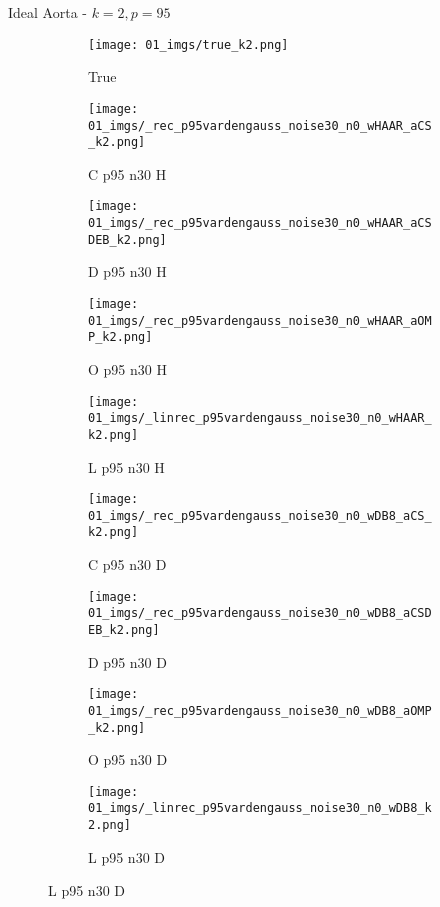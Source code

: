 \begin{frame}{Ideal Aorta - $k=2,p=95$}{}
\begin{figure}
\begin{subfigure}{0.1\textwidth}
\texttt{[image: 01\_imgs/true\_k2.png]}
\caption*{\Tiny True}
\end{subfigure}
\begin{subfigure}{0.1\textwidth}
\texttt{[image: 01\_imgs/\_rec\_p95vardengauss\_noise30\_n0\_wHAAR\_aCS\_k2.png]}
\caption*{\Tiny C p95 n30 H}
\end{subfigure}
\begin{subfigure}{0.1\textwidth}
\texttt{[image: 01\_imgs/\_rec\_p95vardengauss\_noise30\_n0\_wHAAR\_aCSDEB\_k2.png]}
\caption*{\Tiny D p95 n30 H}
\end{subfigure}
\begin{subfigure}{0.1\textwidth}
\texttt{[image: 01\_imgs/\_rec\_p95vardengauss\_noise30\_n0\_wHAAR\_aOMP\_k2.png]}
\caption*{\Tiny O p95 n30 H}
\end{subfigure}
\begin{subfigure}{0.1\textwidth}
\texttt{[image: 01\_imgs/\_linrec\_p95vardengauss\_noise30\_n0\_wHAAR\_k2.png]}
\caption*{\Tiny L p95 n30 H}
\end{subfigure}
\begin{subfigure}{0.1\textwidth}
\texttt{[image: 01\_imgs/\_rec\_p95vardengauss\_noise30\_n0\_wDB8\_aCS\_k2.png]}
\caption*{\Tiny C p95 n30 D}
\end{subfigure}
\begin{subfigure}{0.1\textwidth}
\texttt{[image: 01\_imgs/\_rec\_p95vardengauss\_noise30\_n0\_wDB8\_aCSDEB\_k2.png]}
\caption*{\Tiny D p95 n30 D}
\end{subfigure}
\begin{subfigure}{0.1\textwidth}
\texttt{[image: 01\_imgs/\_rec\_p95vardengauss\_noise30\_n0\_wDB8\_aOMP\_k2.png]}
\caption*{\Tiny O p95 n30 D}
\end{subfigure}
\begin{subfigure}{0.1\textwidth}
\texttt{[image: 01\_imgs/\_linrec\_p95vardengauss\_noise30\_n0\_wDB8\_k2.png]}
\caption*{\Tiny L p95 n30 D}
\end{subfigure}
\end{figure}
\end{frame}


